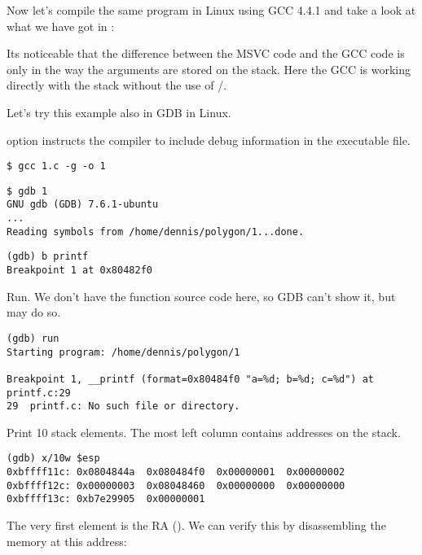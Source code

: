 
Now let's compile the same program in Linux using GCC 4.4.1 and take a look at what we have got in \IDA:



Its noticeable that the difference between the MSVC code and the GCC code is only in the way the arguments are stored on the stack.
Here the GCC is working directly with the stack without the use of \PUSH/\POP.


Let's try this example also in \ac{GDB} in Linux.

 option instructs the compiler to include debug information in the executable file.

\begin{lstlisting}
$ gcc 1.c -g -o 1
\end{lstlisting}

\begin{lstlisting}
$ gdb 1
GNU gdb (GDB) 7.6.1-ubuntu
...
Reading symbols from /home/dennis/polygon/1...done.
\end{lstlisting}

\begin{lstlisting}[caption=let's set breakpoint on \printf]
(gdb) b printf
Breakpoint 1 at 0x80482f0
\end{lstlisting}

Run.
We don't have the \printf function source code here, so \ac{GDB} can't show it, but may do so.

\begin{lstlisting}
(gdb) run
Starting program: /home/dennis/polygon/1 

Breakpoint 1, __printf (format=0x80484f0 "a=%d; b=%d; c=%d") at printf.c:29
29	printf.c: No such file or directory.
\end{lstlisting}

Print 10 stack elements. The most left column contains addresses on the stack.

\begin{lstlisting}
(gdb) x/10w $esp
0xbffff11c:	0x0804844a	0x080484f0	0x00000001	0x00000002
0xbffff12c:	0x00000003	0x08048460	0x00000000	0x00000000
0xbffff13c:	0xb7e29905	0x00000001
\end{lstlisting}

The very first element is the \ac{RA} ().
We can verify this by disassembling the memory at this address:

